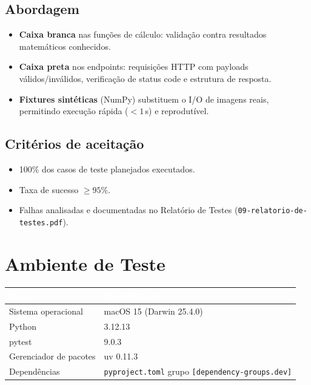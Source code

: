 \documentclass[11pt, a4paper]{article}
\begin{document}
\subsection{Abordagem}

\begin{itemize}
  \item \textbf{Caixa branca} nas funções de cálculo: validação contra resultados matemáticos conhecidos.
  \item \textbf{Caixa preta} nos endpoints: requisições HTTP com payloads válidos/inválidos, verificação de status code e estrutura de resposta.
  \item \textbf{Fixtures sintéticas} (NumPy) substituem o I/O de imagens reais, permitindo execução rápida ($<1$\,s) e reprodutível.
\end{itemize}

\subsection{Critérios de aceitação}

\begin{itemize}
  \item 100\% dos casos de teste planejados executados.
  \item Taxa de sucesso $\geq 95\%$.
  \item Falhas analisadas e documentadas no Relatório de Testes (\texttt{09-relatorio-de-testes.pdf}).
\end{itemize}

\section{Ambiente de Teste}

\begin{table}[H]
\centering
\small
{}
\begin{tabularx}{\textwidth}{@{}lX@{}}
\toprule
\rowcolor{tabheader}\textcolor{white}{\textbf{Item}} & \textcolor{white}{\textbf{Especificação}}\\
\midrule
Sistema operacional & macOS 15 (Darwin 25.4.0)\\
Python & 3.12.13\\
pytest & 9.0.3\\
Gerenciador de pacotes & uv 0.11.3\\
Dependências & \texttt{pyproject.toml} grupo \texttt{[dependency-groups.dev]}\\
\bottomrule
\end{tabularx}
\end{table}
\end{document}
